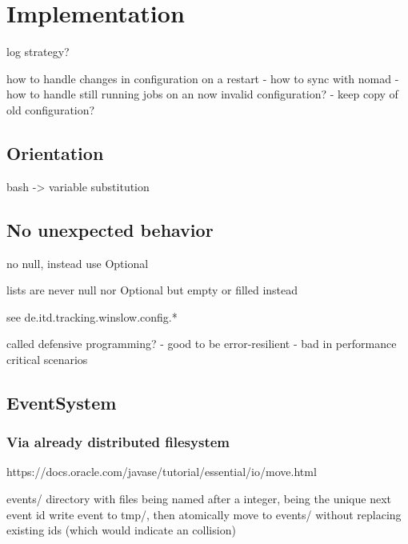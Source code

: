 \chapter{Implementation}

log strategy?

how to handle changes in configuration on a restart
 - how to sync with nomad
 - how to handle still running jobs on an now invalid configuration?
    - keep copy of old configuration?

\section{Orientation}

bash -> variable substitution

\section{No unexpected behavior}

no null, instead use Optional

lists are never null nor Optional but empty or filled instead

see de.itd.tracking.winslow.config.*

called defensive programming?
  - good to be error-resilient
  - bad in performance critical scenarios
  
\section{EventSystem}

\subsection{Via already distributed filesystem}

https://docs.oracle.com/javase/tutorial/essential/io/move.html

events/ directory with files being named after a integer, being the unique next event id
write event to tmp/, then atomically move to events/ without replacing existing ids (which would indicate an collision)